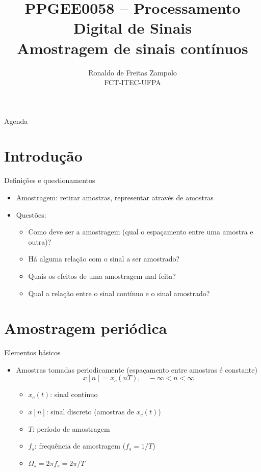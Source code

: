 \documentclass[
size=11pt,
paper=screen,
mode=present,
display=slidesnotes,
style=paintings,
nopagebreaks,
blackslide,
fleqn]{powerdot}
\title{\Large PPGEE0058 -- Processamento Digital de Sinais\\ \vspace{1cm}Amostragem de sinais contínuos}
\author{Ronaldo de Freitas Zampolo\\FCT-ITEC-UFPA}
\date{ }
\begin{document}
\maketitle[randomdots={false}]
   \begin{slide}{Agenda}
      \tableofcontents[content=sections]
   \end{slide}

\section{Introdução}
\begin{slide}{Definições e questionamentos}
\begin{itemize}
   \item Amostragem: retirar amostras, representar atrav\'es de amostras
   \item Quest\~oes:
   \begin{itemize}
      \item Como deve ser a amostragem (qual o espa\c camento entre uma amostra e outra)?
      \item H\'a alguma rela\c c\~ao com o sinal a ser amostrado?
      \item Quais os efeitos de uma amostragem mal feita?
      \item Qual a rela\c c\~ao entre o sinal cont\'inuo e o sinal amostrado?
   \end{itemize}
\end{itemize}
\end{slide}

\section{Amostragem periódica}
\begin{slide}{Elementos básicos}
\begin{itemize}
   \item Amostras tomadas periodicamente (espa\c camento entre amostras \'e constante)
   \begin{equation}
      x[n] = x_c(nT), \quad -\infty<n<\infty
   \end{equation}
   \begin{itemize}
      \item $x_c(t)$: sinal cont\'inuo
      \item $x[n]$: sinal discreto (amostras de $x_c(t)$)
      \item $T$: per\'iodo de amostragem
      \item $f_s$: frequ\^encia de amostragem ($f_s=1/T$)
      \item $\Omega_s=2\pi f_s=2\pi/T$
   \end{itemize}
\end{itemize}
\end{slide}
\end{document}
